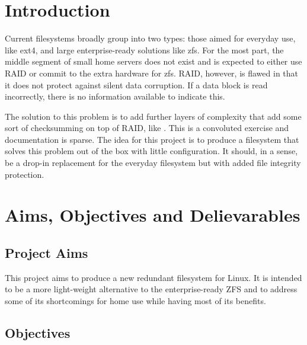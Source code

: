 %
%
\section{Introduction}

    Current filesystems broadly group into two types: those aimed for everyday
    use, like ext4, and large enterprise-ready solutions like zfs. For the most
    part, the middle segment of small home servers does not exist and is
    expected to either use RAID or commit to the extra hardware for zfs. RAID,
    however, is flawed in that it does not protect against silent data
    corruption. If a data block is read incorrectly, there is no information
    available to indicate this.

    The solution to this problem is to add further layers of complexity that
    add some sort of checksumming on top of RAID, like \cite{backblaze}. This
    is a convoluted exercise and documentation is sparse. The idea for this
    project is to produce a filesystem that solves this problem out of the box
    with little configuration. It should, in a sense, be a drop-in replacement
    for the everyday filesystem but with added file integrity protection.


%
%
\section{Aims, Objectives and Delievarables}

\subsection{Project Aims}

    This project aims to produce a new redundant filesystem for Linux. It is
    intended to be a more light-weight alternative to the enterprise-ready ZFS
    and to address some of its shortcomings for home use while having most of
    its benefits.

\subsection{Objectives}

